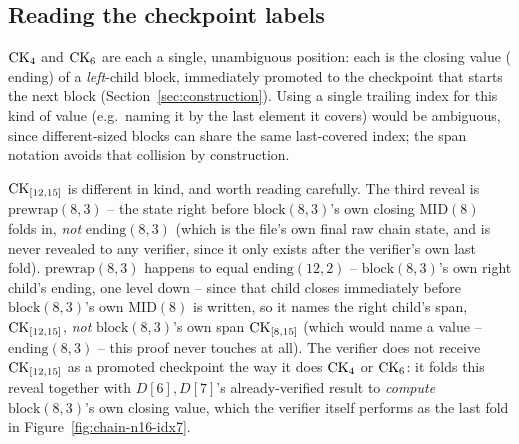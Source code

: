 \subsection{Reading the checkpoint labels}

$\mathrm{CK}_4$ and $\mathrm{CK}_6$ are each a single, unambiguous position: each is the
closing value ($\mathrm{ending}$) of a \emph{left}-child block, immediately
promoted to the checkpoint that starts the next block
(Section~\ref{sec:construction}). Using a single trailing index for this
kind of value (e.g.\ naming it by the last element it covers) would be
ambiguous, since different-sized blocks can share the same last-covered
index; the span notation avoids that collision by construction.

$\mathrm{CK}_{[12,15]}$ is different in kind, and worth reading carefully. The
third reveal is $\mathrm{prewrap}(8,3)$ -- the state right before
$\mathrm{block}(8,3)$'s own closing $\mathrm{MID}(8)$ folds in, \emph{not}
$\mathrm{ending}(8,3)$ (which is the file's own final raw chain state, and
is never revealed to any verifier, since it only exists after the
verifier's own last fold). $\mathrm{prewrap}(8,3)$ happens to equal
$\mathrm{ending}(12,2)$ -- $\mathrm{block}(8,3)$'s own right child's ending,
one level down -- since that child closes immediately before
$\mathrm{block}(8,3)$'s own $\mathrm{MID}(8)$ is written, so it names the
right child's span, $\mathrm{CK}_{[12,15]}$, \emph{not} $\mathrm{block}(8,3)$'s own
span $\mathrm{CK}_{[8,15]}$ (which would name a value -- $\mathrm{ending}(8,3)$ --
this proof never touches at all). The verifier does not receive
$\mathrm{CK}_{[12,15]}$ as a promoted checkpoint the way it does $\mathrm{CK}_4$ or
$\mathrm{CK}_6$: it folds this reveal together with $D[6],D[7]$'s already-verified
result to \emph{compute} $\mathrm{block}(8,3)$'s own closing value, which
the verifier itself performs as the last fold in
Figure~\ref{fig:chain-n16-idx7}.
